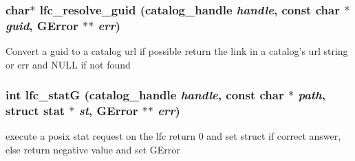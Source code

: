 \subsubsection{\setlength{\rightskip}{0pt plus 5cm}char$\ast$ lfc\_\-resolve\_\-guid (catalog\_\-handle {\em handle}, const char $\ast$ {\em guid}, GError $\ast$$\ast$ {\em err})}\label{gfal__common__lfc_8c_b8943f8f5fd7211851bf7732d9c3b50b}


Convert a guid to a catalog url if possible return the link in a catalog's url string or err and NULL if not found 
\subsubsection{\setlength{\rightskip}{0pt plus 5cm}int lfc\_\-stat\-G (catalog\_\-handle {\em handle}, const char $\ast$ {\em path}, struct stat $\ast$ {\em st}, GError $\ast$$\ast$ {\em err})}\label{gfal__common__lfc_8c_51eb57986d959b753dbad4737f3e1b6f}


execute a posix stat request on the lfc return 0 and set struct if correct answer, else return negative value and set GError 